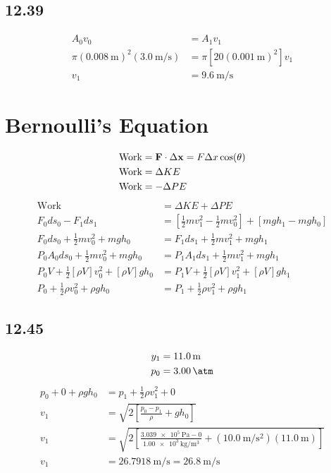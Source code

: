 \documentclass{article}
\begin{document}
\subsection{12.39}

\begin{align*}
	A_0v_0 & = A_1v_1 \\
	\pi (\SI{0.008}{\meter})^2(\SI{3.0}{\meter \per \second}) & = \pi [20(\SI{0.001}{\meter})^2]v_1 \\
	v_1 & = \SI{9.6}{\meter \per \second}
\end{align*}

\section{Bernoulli's Equation}

\begin{align*}
	\text{Work} & = \vect{F} \cdot \Delta \vect{x} = F\Delta x\cos(\theta) \\
	\text{Work} & = \Delta KE \\
	\text{Work} & = -\Delta PE
\end{align*}
\begin{align*}
	\text{Work} & = \Delta KE + \Delta PE \\
	F_0ds_0 - F_1ds_1 & = \left[ \frac{1}{2}mv_1^2 - \frac{1}{2}mv_0^2 \right] + \left[ mgh_1 - mgh_0 \right] \\
	F_0ds_0 + \frac{1}{2}mv_0^2 + mgh_0 & = F_1ds_1 + \frac{1}{2}mv_1^2 + mgh_1 \\
	P_0A_0ds_0 + \frac{1}{2}mv_0^2 + mgh_0 & = P_1A_1ds_1 + \frac{1}{2}mv_1^2 + mgh_1 \\
	P_0V + \frac{1}{2} \left[ \rho V \right] v_0^2 +  \left[ \rho V \right] gh_0 & = P_1V + \frac{1}{2} \left[ \rho V \right] v_1^2 +  \left[ \rho V \right] gh_1 \\
	P_0 + \frac{1}{2}\rho v_0^2 + \rho gh_0 & = P_1 + \frac{1}{2}\rho v_1^2 + \rho gh_1
\end{align*}

\subsection{12.45}

\begin{align*}
	y_1 & = \SI{11.0}{\meter} \\
	p_0 & = \SI{3.00}{\atm}
\end{align*}
\begin{align*}
	p_0 + 0 + \rho gh_0 & = p_1 + \frac{1}{2}\rho v_1^2 + 0 \\
	v_1 & = \sqrt{ 2 \left[ \frac{ p_0 - p_1 }{ \rho } + gh_0 \right] } \\
	v_1 & = \sqrt{ 2 \left[ \frac{ \SI{3.039e5}{\pascal} - 0 }{ \SI{1.00e3}{\kilogram \per \meter \cubed} } + (\SI{10.0}{\meter \per \second \squared})(\SI{11.0}{\meter}) \right] } \\
	v_1 & = \SI{26.7918}{\meter \per \second} = \SI{26.8}{\meter \per \second}
\end{align*}
\end{document}
